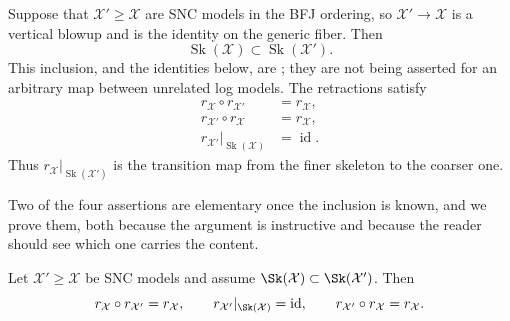 Suppose that $\mathcal X'\geq\mathcal X$ are SNC models in the BFJ
ordering, so $\mathcal X'\to\mathcal X$ is a vertical blowup and is the
identity on the generic fiber. Then
\[
              \operatorname{Sk}(\mathcal X)
              \subset \operatorname{Sk}(\mathcal X').
\]
This inclusion, and the identities below, are
\cite[Proposition~3.6]{BFJ16}; they are not being asserted for an arbitrary
map between unrelated log models.
The retractions satisfy
\[
\begin{split}
 r_{\mathcal X}\circ r_{\mathcal X'}&=r_{\mathcal X},\\
 r_{\mathcal X'}\circ r_{\mathcal X}&=r_{\mathcal X},\\
 r_{\mathcal X'}|_{\operatorname{Sk}(\mathcal X)}
       &=\operatorname{id}.
\end{split}
\]
Thus $r_{\mathcal X}|_{\operatorname{Sk}(\mathcal X')}$ is the transition
map from the finer skeleton to the coarser one.

Two of the four assertions are elementary once the inclusion is known, and
we prove them, both because the argument is instructive and because the
reader should see which one carries the content.

\begin{proposition}
\label{prop:skeleton-nesting}
Let $\mathcal X'\geq\mathcal X$ be SNC models and assume
$\Sk(\mathcal X)\subset\Sk(\mathcal X')$. Then
\[
 r_{\mathcal X}\circ r_{\mathcal X'}=r_{\mathcal X},
 \qquad
 r_{\mathcal X'}|_{\Sk(\mathcal X)}=\operatorname{id},
 \qquad
 r_{\mathcal X'}\circ r_{\mathcal X}=r_{\mathcal X}.
\]
\end{proposition}

